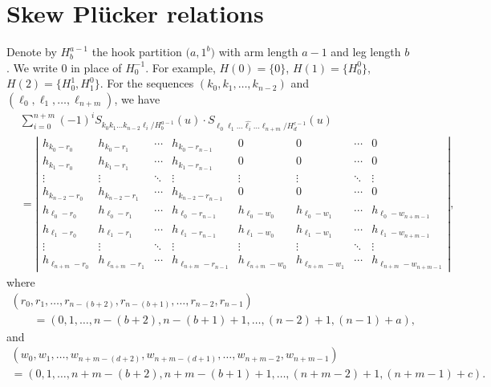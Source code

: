 \documentclass[pdftex]{sigma}
\numberwithin{equation}{section}
\begin{document}
\section{Skew Pl\"ucker relations}\label{section3}
Denote by $H^{a-1}_{b}$ the hook partition $\bigl(a,1^b\bigr)$ with arm length $a-1$ and leg length $b$.
We write $0$ in place of $H^{-1}_{0}$. For example, $H(0)=\{0\}$, $H(1)=\bigl\{H^{0}_{0}\bigr\}$, $H(2)=\bigl\{H^{1}_{0},H^{0}_{1}\bigr\}$. For the sequences $(k_{0},k_1,\dots,k_{n-2})$ and $(\ell_0,\ell_1,\dots, \ell_{n+m})$, we have
\begin{align}
&\sum_{i=0}^{n+m}{(-1)}^{i}S_{k_0 k_1\dots k_{n-2}\ell_i/{H^{a-1}_{b}}}(u)\cdot S_{\ell_0 \ell_1\dots \widehat{\ell_{i}}\dots\ell_{n+m}/{H^{c-1}_{d}}}(u)\label{skewplu}\\
&=\left|\begin{array}{cccc|cccc}
h_{k_0-r_{0}^{}} & h_{k_0-r_{1}^{}} & \cdots &h_{k_0-r_{n-1}^{}}& 0 & 0 & \cdots & 0\\
h_{k_{1}-r_{0}^{}} & h_{k_{1}-r_{1}^{}} & \cdots &h_{k_{1}-r_{n-1}^{}}& 0 & 0 & \cdots & 0 \\
\vdots & \vdots & \ddots & \vdots & \vdots &\vdots & \ddots & \vdots \\
h_{k_{n-2}-r_{0}^{}} & h_{k_{n-2}-r_{1}^{}} & \cdots &h_{k_{n-2}-r_{n-1}^{}} &0 & 0 & \cdots & 0 \\
h_{\ell_0-r_{0}^{}} & h_{\ell_0-r_{1}^{}} & \cdots &h_{{\ell_0}-r_{n-1}^{}}& h_{\ell_{0}-w_{0}^{}} & h_{\ell_{0}-w_{1}^{}} & \cdots & h_{\ell_{0}-w_{n+m-1}^{}} \\[1mm]\hline
h_{\ell_1-r_{0}^{}} & h_{\ell_1-r_{1}^{}} & \cdots &h_{{\ell_1}-r_{n-1}^{}}& h_{\ell_{1}-w_{0}^{}}& h_{\ell_{1}-w_{1}^{}} & \cdots & h_{\ell_{1}-w_{n+m-1}^{}}\\
\vdots & \vdots& \ddots & \vdots &\vdots &\vdots & \ddots & \vdots \\
h_{\ell_{n+m}-r_{0}^{}} & h_{\ell_{n+m}-r_{1}^{}} & \cdots &h_{{\ell_{n+m}}-r_{n-1}^{}}& h_{\ell_{n+m}-w_{0}^{}} & h_{\ell_{n+m}-w_{1}^{}} & \cdots & h_{\ell_{n+m}-w_{n+m-1}^{}}
\end{array}\right|\!,\nonumber%
\end{align}
where
\begin{gather*}
(r_0,r_1,\dots,r_{n-(b+2)},r_{n-(b+1)},\dots,r_{n-2},r_{n-1})\\
\qquad{}=(0,1,\dots,n-(b+2),n-(b+1)+1,\dots,(n-2)+1,(n-1)+a),
\end{gather*}
and
\begin{gather*}
(w_0,w_1,\dots,w_{n+m-(d+2)},w_{n+m-(d+1)},\dots,w_{n+m-2},w_{n+m-1})\\
=(0,1,\dots,n+m-(b+2),n+m-(b+1)+1,\dots,(n+m-2)+1,(n+m-1)+c).
\end{gather*}
\end{document}
